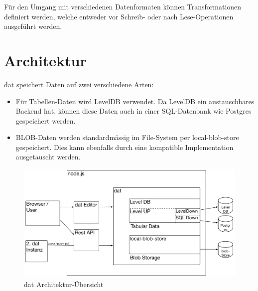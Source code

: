 Für den Umgang mit verschiedenen Datenformaten können Transformationen \cite[transformations]{dat-js-api} definiert werden, welche entweder vor Schreib- oder nach Lese-Operationen ausgeführt werden.

\section{Architektur}


dat speichert Daten auf zwei verschiedene Arten:
\begin{itemize}
\item Für Tabellen-Daten wird LevelDB verwendet. Da LevelDB ein austauschbares Backend hat, können diese Daten auch in einer SQL-Datenbank wie Postgres gespeichert werden.
\item BLOB-Daten werden standardmässig im File-System per local-blob-store gespeichert. Dies kann ebenfalls durch eine kompatible Implementation ausgetauscht werden.
\end{itemize}

\begin{figure}[H]
  \centering
  \includegraphics[width=\linewidth,clip]{fig/dat-architecture}
  \caption{dat Architektur-Übersicht}
  \label{fig:dat-architecture-overview}
\end{figure}

